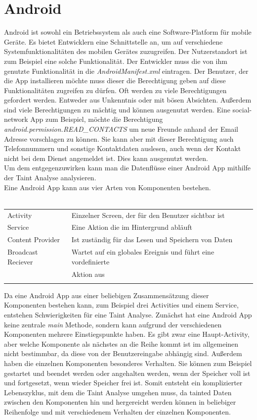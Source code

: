 \documentclass[runningheads]{llncs}
\begin{document}
\section{Android}\label{sec:android}
Android ist sowohl ein Betriebssystem als auch eine Software-Platform für mobile Geräte. Es bietet Entwicklern eine Schnittstelle an, um auf verschiedene Systemfunktionalitäten des mobilen Gerätes zuzugreifen. Der Nutzerstandort ist zum Beispiel eine solche Funktionalität. Der Entwickler muss die von ihm genutzte Funktionalität in die \emph{AndroidManifest.xml} eintragen. Der Benutzer, der die App installieren möchte muss dieser die Berechtigung geben auf diese Funktionalitäten zugreifen zu dürfen. Oft werden zu viele Berechtigungen gefordert werden. Entweder aus Unkenntnis oder mit bösen Absichten. Außerdem sind viele Berechtigungen zu mächtig und können ausgenutzt werden. Eine social-network App zum Beispiel, möchte die Berechtigung\\\emph{android.permission.READ\_CONTACTS} um neue Freunde anhand der Email Adresse vorschlagen zu können. Sie kann aber mit dieser Berechtigung auch Telefonnummern und sonstige Kontaktdaten auslesen, auch wenn der Kontakt nicht bei dem Dienst angemeldet ist. Dies kann ausgenutzt werden.\\
Um dem entgegenzuwirken kann man die Datenflüsse einer Android App mithilfe der Taint Analyse analysieren. \\
Eine Android App kann aus vier Arten von Komponenten bestehen.\\\\
\begin{tabular}{ll}
	Activity & Einzelner Screen, der für den Benutzer sichtbar ist\\
	Service & Eine Aktion die im Hintergrund abläuft\\
	Content Provider & Ist zuständig für das Lesen und Speichern von Daten\\
	Broadcast Reciever & Wartet auf ein globales Ereignis und führt eine vordefinierte \\
	& Aktion aus\\\\
\end{tabular}
Da eine Android App aus einer beliebigen Zusammensätzung dieser Komponenten bestehen kann, zum Beispiel drei Activities und einem Service, entstehen Schwierigkeiten für eine Taint Analyse. Zunächst hat eine Android App keine zentrale \emph{main} Methode, sondern kann aufgrund der verschiedenen Komponenten mehrere Einstiegspunkte haben. Es gibt zwar eine Haupt-Activity, aber welche Komponente als nächstes an die Reihe kommt ist im allgemeinen nicht bestimmbar, da diese von der Benutzereingabe abhängig sind. Außerdem haben die einzelnen Komponenten besonderes Verhalten. Sie können zum Beispiel gestartet und beendet werden oder angehalten werden, wenn der Speicher voll ist und fortgesetzt, wenn wieder Speicher frei ist. Somit entsteht ein komplizierter Lebenszyklus, mit dem die Taint Analyse umgehen muss, da tainted Daten zwischen den Komponenten hin und hergereicht werden können in beliebiger Reihenfolge und mit verschiedenem Verhalten der einzelnen Komponenten. 
\end{document}
